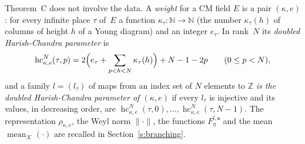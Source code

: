\documentclass[11pt,a4paper]{article}
\newcommand{\kw}[1]{\emph{#1}}
\newcommand{\m}[1]{\mbox{$#1$}}        %
\theoremstyle{plainx}
\theoremstyle{uprightx}
\newcommand{\ZZ}{\mathbb{Z}}
\newcommand{\NN}{\mathbb{N}}
\newcommand{\hc}[4]{\operatorname{hc}_{#1,#2}^{#3}(#4)}   %
\newcommand{\wrep}[2]{\rho_{#1,#2}}
\newcommand{\wn}[1]{\lVert #1\rVert}
\newcommand{\Fof}[3]{F^{#1,#2}_{#3}}
\newcommand{\clint}[2]{\operatorname{mean}_{#1}(#2)}
\begin{document}
Theorem~C does not involve the data. A \kw{weight} for a CM field $E$ is a pair $(\kappa,e)$: for every infinite
place $\tau$ of~$E$ a function \m{\kappa_\tau\colon\NN\to\NN} (the number $\kappa_\tau(h)$ of columns of height $h$
of a Young diagram) and an integer $e_\tau$. In rank~$N$ its \kw{doubled Harish-Chandra parameter} is
\[\hc{\kappa}{e}{N}{\tau,p}=2\Bigl(e_\tau+\sum_{p<h<N}\kappa_\tau(h)\Bigr)+N-1-2p\qquad(0\le p<N),\]
and a family $l=(l_\tau)$ of maps from an index set of $N$ elements to $\ZZ$ \kw{is the doubled Harish-Chandra
parameter of $(\kappa,e)$} if every $l_\tau$ is injective and its values, in decreasing order, are
$\hc{\kappa}{e}{N}{\tau,0},\dots,\hc{\kappa}{e}{N}{\tau,N-1}$. The representation $\wrep{\kappa}{e}$, the Weyl norm
$\wn{\cdot}$, the functions $\Fof{l}{\mathbf{s}}{\eta}$ and the mean $\clint{\mathcal{K}}{\cdot}$ are recalled in
Section~\ref{s:branching}.
\end{document}

